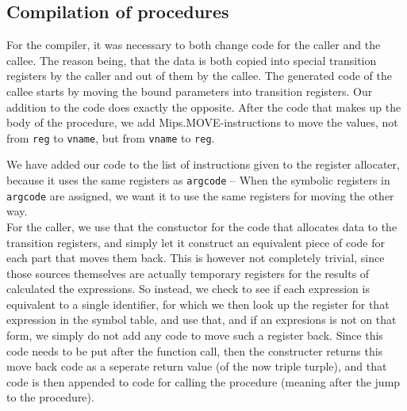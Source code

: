 \documentclass{article}
\begin{document}
\subsection{Compilation of procedures}
For the compiler, it was necessary to both change code for the caller and the callee.
The reason being, that the data is both copied into special transition registers by the caller and out of them by the callee.
The generated code of the callee starts by moving the bound parameters into transition registers. Our addition to the code
does exactly the opposite. After the code that makes up the body of the procedure, we add Mips.MOVE-instructions
to move the values, not from \texttt{reg} to \texttt{vname}, but from \texttt{vname} to \texttt{reg}.

We have added our code to the list of instructions given to the register allocater, because it uses the same
registers as \texttt{argcode} -- When the symbolic registers in \texttt{argcode} are assigned, we want it to
use the same registers for moving the other way.
\\
For the caller, we use that the constuctor for the code that allocates data to the transition registers,
and simply let it construct an equivalent piece of code for each part that moves them back.
This is however not completely trivial, since those sources themselves are actually temporary registers
for the results of calculated the expressions. So instead, we check to see if each expression is equivalent
to a single identifier, for which we then look up the register for that expression in the symbol table,
and use that, and if an expresions is not on that form, we simply do not add any code to move such a register back.
Since this code needs to be put after the function call, then the constructer returns this move back code as a seperate
return value (of the now triple turple), and that code is then appended to code for calling the procedure
(meaning after the jump to the procedure).
\end{document}
